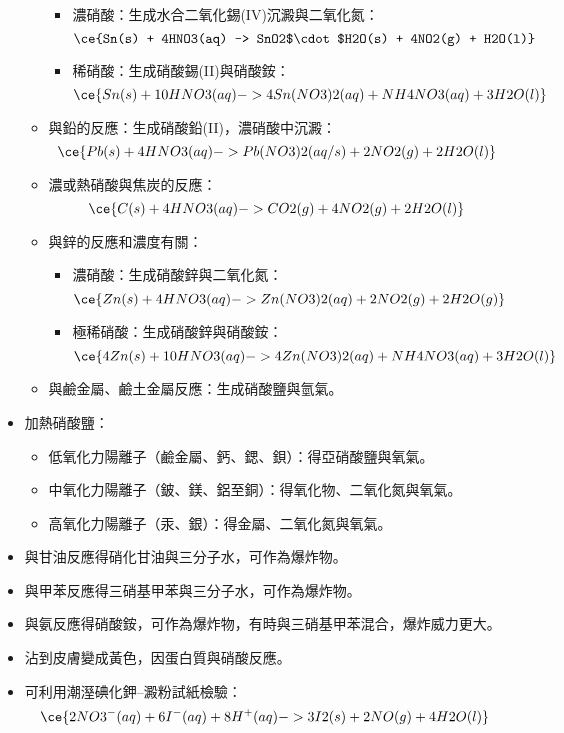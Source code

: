 \documentclass[a4paper,12pt]{report}
\begin{document}
\begin{itemize}
\begin{itemize}
\begin{itemize}
\item 濃硝酸：生成水合二氧化錫(IV)沉澱與二氧化氮：
\[\ce{Sn(s) + 4HNO3(aq) -> SnO2$\cdot$H2O(s) + 4NO2(g) + H2O(l)}\]
\item 稀硝酸：生成硝酸錫(II)與硝酸銨：
\[\ce{Sn(s) + 10HNO3(aq) -> 4Sn(NO3)2(aq) + NH4NO3(aq) + 3H2O(l)}\]
\end{itemize}
\item 與鉛的反應：生成硝酸鉛(II)，濃硝酸中沉澱：
\[\ce{Pb(s) + 4HNO3(aq) -> Pb(NO3)2(aq/s) + 2NO2(g) + 2H2O(l)}\]
\item 濃或熱硝酸與焦炭的反應：
\[\ce{C(s) + 4HNO3(aq) -> CO2(g) + 4NO2(g) + 2H2O(l)}\]
\item 與鋅的反應和濃度有關：
\begin{itemize}
\item 濃硝酸：生成硝酸鋅與二氧化氮：
\[\ce{Zn(s) + 4HNO3(aq) -> Zn(NO3)2(aq) + 2NO2(g) + 2H2O(g)}\]
\item 極稀硝酸：生成硝酸鋅與硝酸銨：
\[\ce{4Zn(s) + 10HNO3(aq) -> 4Zn(NO3)2(aq) + NH4NO3(aq) + 3H2O(l)}\]
\end{itemize}
\item 與鹼金屬、鹼土金屬反應：生成硝酸鹽與氫氣。
\end{itemize}
\item 加熱硝酸鹽：
\begin{itemize}
\item 低氧化力陽離子（鹼金屬、鈣、鍶、鋇）：得亞硝酸鹽與氧氣。
\item 中氧化力陽離子（鈹、鎂、鋁至銅）：得氧化物、二氧化氮與氧氣。
\item 高氧化力陽離子（汞、銀）：得金屬、二氧化氮與氧氣。
\end{itemize}
\item 與甘油反應得硝化甘油與三分子水，可作為爆炸物。
\item 與甲苯反應得三硝基甲苯與三分子水，可作為爆炸物。
\item 與氨反應得硝酸銨，可作為爆炸物，有時與三硝基甲苯混合，爆炸威力更大。
\item 沾到皮膚變成黃色，因蛋白質與硝酸反應。
\item 可利用潮溼碘化鉀–澱粉試紙檢驗：
\[\ce{2NO3^-(aq) + 6I^-(aq) + 8H^+(aq) -> 3I2(s) + 2NO(g) + 4H2O(l)}\]
\end{itemize}
\end{document}

